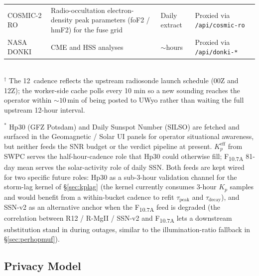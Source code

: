 \documentclass[11pt,a4paper]{article}
\newcommand{\SI}[2]{#1\,\text{#2}}
\newcommand{\hour}{\text{h}}
\begin{document}
\begin{table}[H]
\begin{tabular}{@{}p{2.7cm}p{6.6cm}p{1.6cm}p{3.6cm}@{}}
\addlinespace
COSMIC-2 RO & Radio-occultation electron-density peak parameters (foF2 / hmF2) for the fuse grid & Daily extract & Proxied via \texttt{/api/cosmic-ro} \\
\addlinespace
NASA DONKI~\cite{donki} & CME and HSS analyses & ${\sim}$hours & Proxied via \texttt{/api/donki-*} \\
\bottomrule
\end{tabular}\\[4pt]
\footnotesize
$^{\dagger}$ The \SI{12}{\hour} cadence reflects the upstream
radiosonde launch schedule (00Z and 12Z); the worker-side cache
polls every 10 min so a new sounding reaches the operator within
${\sim}\!10$\,min of being posted to UWyo rather than waiting
the full upstream 12-hour interval.

$^{*}$ Hp30 (GFZ Potsdam) and Daily Sunspot Number (SILSO) are
fetched and surfaced in the Geomagnetic / Solar UI panels for
operator situational awareness, but neither feeds the SNR budget
or the verdict pipeline at present.  $K_p^{\text{eff}}$ from SWPC
serves the half-hour-cadence role that Hp30 could otherwise fill;
F\textsubscript{10.7A} 81-day mean serves the solar-activity role
of daily SSN.  Both feeds are kept wired for two specific future
roles: Hp30 as a sub-3-hour validation channel for the storm-lag
kernel of \S\ref{sec:kplag} (the kernel currently consumes
3-hour $K_p$ samples and would benefit from a within-bucket
cadence to refit $\tau_{\text{peak}}$ and
$\tau_{\text{decay}}$), and SSN-v2 as an alternative anchor
when the F\textsubscript{10.7A} feed is degraded (the
correlation between R12 / R-MgII / SSN-v2 and
F\textsubscript{10.7A} lets a downstream substitution stand in
during outages, similar to the illumination-ratio fallback in
\S\ref{sec:perhopmuf}).
\end{table}

\subsection{Privacy Model}\label{sec:privacy}
\end{document}
